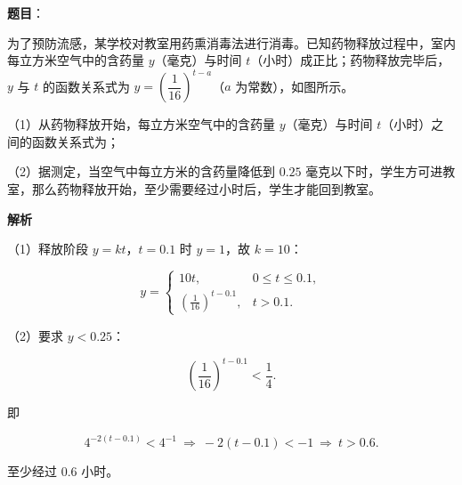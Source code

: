 \begin{answer}

\textbf{题目}：

为了预防流感，某学校对教室用药熏消毒法进行消毒。已知药物释放过程中，室内每立方米空气中的含药量 $y$（毫克）与时间 $t$（小时）成正比；药物释放完毕后，$y$ 与 $t$ 的函数关系式为 $y=\left(\dfrac1{16}\right)^{t-a}$（$a$ 为常数），如图所示。

（1）从药物释放开始，每立方米空气中的含药量 $y$（毫克）与时间 $t$（小时）之间的函数关系式为\gkblank{}；

（2）据测定，当空气中每立方米的含药量降低到 $0.25$ 毫克以下时，学生方可进教室，那么药物释放开始，至少需要经过\gkblank{}小时后，学生才能回到教室。
\nopagebreak[4]
\begin{center}\end{center}
\nopagebreak[4]
\textbf{解析}

（1）释放阶段 $y=kt$，$t=0.1$ 时 $y=1$，故 $k=10$：

\nopagebreak[4]
\[y=\begin{cases}10t,&0\leqslant t\leqslant0.1,\\ \left(\frac1{16}\right)^{t-0.1},&t>0.1.\end{cases}\]

（2）要求 $y<0.25$：

\nopagebreak[4]
\[\left(\frac1{16}\right)^{t-0.1}<\frac14.\]

即

\nopagebreak[4]
\[4^{-2(t-0.1)}<4^{-1}\ \Rightarrow\ -2(t-0.1)<-1\ \Rightarrow\ t>0.6.\]

至少经过 $0.6$ 小时。


\end{answer}
